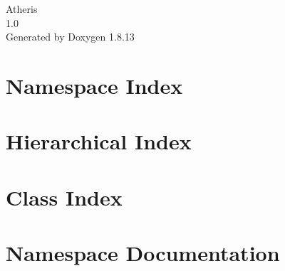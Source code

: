 \documentclass[twoside]{book}
\newcommand{\+}{\discretionary{\mbox{\scriptsize$\hookleftarrow$}}{}{}}
\newcommand{\clearemptydoublepage}{%
  \newpage{\pagestyle{empty}\cleardoublepage}%
}
\begin{document}
\hypersetup{pageanchor=false,
             bookmarksnumbered=true,
             pdfencoding=unicode
            }
\begin{titlepage}
\vspace*{7cm}
\begin{center}%
{\Large Atheris \\[1ex]\large 1.\+0 }\\
\vspace*{1cm}
{\large Generated by Doxygen 1.8.13}\\
\end{center}
\end{titlepage}
\clearemptydoublepage
{}
\tableofcontents
\clearemptydoublepage
{}
\hypersetup{pageanchor=true}

\chapter{Namespace Index}

\chapter{Hierarchical Index}

\chapter{Class Index}

\chapter{Namespace Documentation}
















\end{document}
